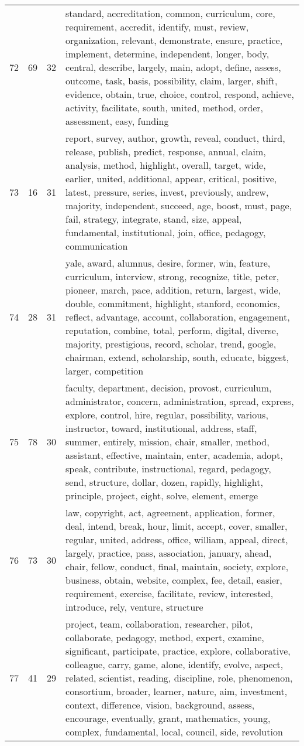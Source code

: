 \begin{table}[ht]
{\begin{tabularx}{\textwidth}{llrX}
   72 & 69 & 32 & standard, accreditation, common, curriculum, core, requirement, accredit, identify, must, review, organization, relevant, demonstrate, ensure, practice, implement, determine, independent, longer, body, central, describe, largely, main, adopt, define, assess, outcome, task, basis, possibility, claim, larger, shift, evidence, obtain, true, choice, control, respond, achieve, activity, facilitate, south, united, method, order, assessment, easy, funding \\ 
   73 & 16 & 31 & report, survey, author, growth, reveal, conduct, third, release, publish, predict, response, annual, claim, analysis, method, highlight, overall, target, wide, earlier, united, additional, appear, critical, positive, latest, pressure, series, invest, previously, andrew, majority, independent, succeed, age, boost, must, page, fail, strategy, integrate, stand, size, appeal, fundamental, institutional, join, office, pedagogy, communication \\ 
   74 & 28 & 31 & yale, award, alumnus, desire, former, win, feature, curriculum, interview, strong, recognize, title, peter, pioneer, march, pace, addition, return, largest, wide, double, commitment, highlight, stanford, economics, reflect, advantage, account, collaboration, engagement, reputation, combine, total, perform, digital, diverse, majority, prestigious, record, scholar, trend, google, chairman, extend, scholarship, south, educate, biggest, larger, competition \\ 
   75 & 78 & 30 & faculty, department, decision, provost, curriculum, administrator, concern, administration, spread, express, explore, control, hire, regular, possibility, various, instructor, toward, institutional, address, staff, summer, entirely, mission, chair, smaller, method, assistant, effective, maintain, enter, academia, adopt, speak, contribute, instructional, regard, pedagogy, send, structure, dollar, dozen, rapidly, highlight, principle, project, eight, solve, element, emerge \\ 
   76 & 73 & 30 & law, copyright, act, agreement, application, former, deal, intend, break, hour, limit, accept, cover, smaller, regular, united, address, office, william, appeal, direct, largely, practice, pass, association, january, ahead, chair, fellow, conduct, final, maintain, society, explore, business, obtain, website, complex, fee, detail, easier, requirement, exercise, facilitate, review, interested, introduce, rely, venture, structure \\ 
   77 & 41 & 29 & project, team, collaboration, researcher, pilot, collaborate, pedagogy, method, expert, examine, significant, participate, practice, explore, collaborative, colleague, carry, game, alone, identify, evolve, aspect, related, scientist, reading, discipline, role, phenomenon, consortium, broader, learner, nature, aim, investment, context, difference, vision, background, assess, encourage, eventually, grant, mathematics, young, complex, fundamental, local, council, side, revolution \\ 

\end{tabularx}}
\end{table}
